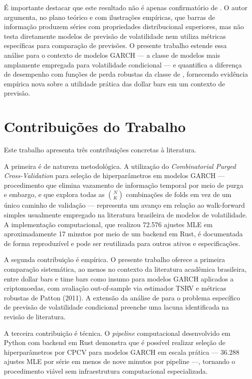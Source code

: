 É importante destacar que este resultado não é apenas confirmatório de .
O autor argumenta, no plano teórico e com ilustrações empíricas, que barras de informação
produzem séries com propriedades distribucional superiores, mas não testa diretamente
modelos de previsão de volatilidade nem utiliza métricas específicas para comparação de
previsões. O presente trabalho estende essa análise para o contexto de modelos GARCH —
a classe de modelos mais amplamente empregada para volatilidade condicional — e quantifica
a diferença de desempenho com funções de perda robustas da classe de ,
fornecendo evidência empírica nova sobre a utilidade prática das dollar bars em um contexto
de previsão.

\section{Contribuições do Trabalho}
\label{sec:contribuicoes}

Este trabalho apresenta três contribuições concretas à literatura.

A primeira é de natureza metodológica. A utilização do \textit{Combinatorial Purged
Cross-Validation} para seleção de hiperparâmetros em modelos GARCH — procedimento que
elimina vazamento de informação temporal por meio de purga e embargo, e que explora
todas as $\binom{N}{K}$ combinações de folds em vez de um único caminho de validação —
representa um avanço em relação ao walk-forward simples usualmente empregado na literatura
brasileira de modelos de volatilidade. A implementação computacional, que realizou 72.576
ajustes MLE em aproximadamente 17 minutos por meio de um backend em Rust, é documentada
de forma reproduzível e pode ser reutilizada para outros ativos e especificações.

A segunda contribuição é empírica. O presente trabalho oferece a primeira comparação
sistemática, ao menos no contexto da literatura acadêmica brasileira, entre dollar bars
e time bars como insumo para modelos GARCH aplicados a criptomoedas, com avaliação
out-of-sample via estimador TSRV e métricas robustas de Patton (2011). A extensão da
análise de  para o problema específico de previsão de volatilidade
condicional preenche uma lacuna identificada na revisão de literatura.

A terceira contribuição é técnica. O \textit{pipeline} computacional desenvolvido em
Python com backend em Rust demonstra que é possível realizar seleção de hiperparâmetros
por CPCV para modelos GARCH em escala prática — 36.288 ajustes MLE por série em menos
de nove minutos por pipeline —, tornando o procedimento viável sem infraestrutura
computacional especializada.

